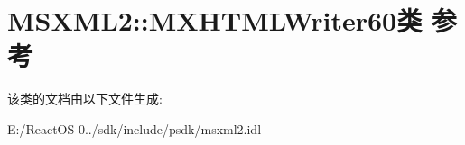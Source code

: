 \hypertarget{class_m_s_x_m_l2_1_1_m_x_h_t_m_l_writer60}{}\section{M\+S\+X\+M\+L2\+:\+:M\+X\+H\+T\+M\+L\+Writer60类 参考}
\label{class_m_s_x_m_l2_1_1_m_x_h_t_m_l_writer60}


该类的文档由以下文件生成\+:\begin{DoxyCompactItemize}
\item 
E\+:/\+React\+O\+S-\/0../sdk/include/psdk/msxml2.\+idl\end{DoxyCompactItemize}
